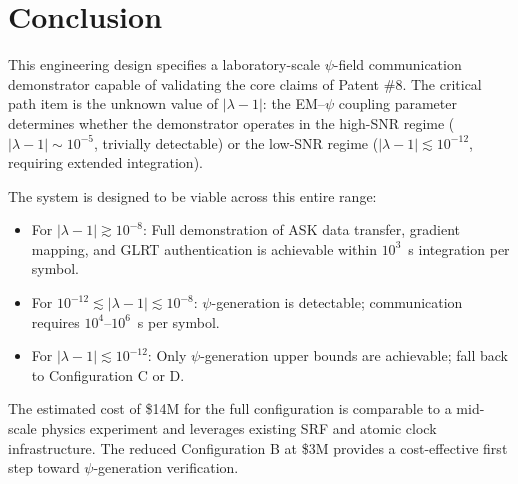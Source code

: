 \documentclass[11pt,onecolumn]{article}
\begin{document}
\section{Conclusion}

This engineering design specifies a laboratory-scale $\psi$-field
communication demonstrator capable of validating the core claims of
Patent \#8.
The critical path item is the unknown value of $|\lambda - 1|$: the
EM--$\psi$ coupling parameter determines whether the demonstrator
operates in the high-SNR regime ($|\lambda - 1| \sim 10^{-5}$, trivially
detectable) or the low-SNR regime ($|\lambda - 1| \lesssim 10^{-12}$,
requiring extended integration).

The system is designed to be viable across this entire range:
\begin{itemize}
\item For $|\lambda - 1| \gtrsim 10^{-8}$: Full demonstration of ASK
data transfer, gradient mapping, and GLRT authentication is achievable
within $10^3$~s integration per symbol.
\item For $10^{-12} \lesssim |\lambda - 1| \lesssim 10^{-8}$: $\psi$-generation
is detectable; communication requires $10^4$--$10^6$~s per symbol.
\item For $|\lambda - 1| \lesssim 10^{-12}$: Only $\psi$-generation
upper bounds are achievable; fall back to Configuration C or D.
\end{itemize}

The estimated cost of \$14M for the full configuration is comparable
to a mid-scale physics experiment and leverages existing SRF and atomic
clock infrastructure.
The reduced Configuration B at \$3M provides a cost-effective first
step toward $\psi$-generation verification.
\end{document}

